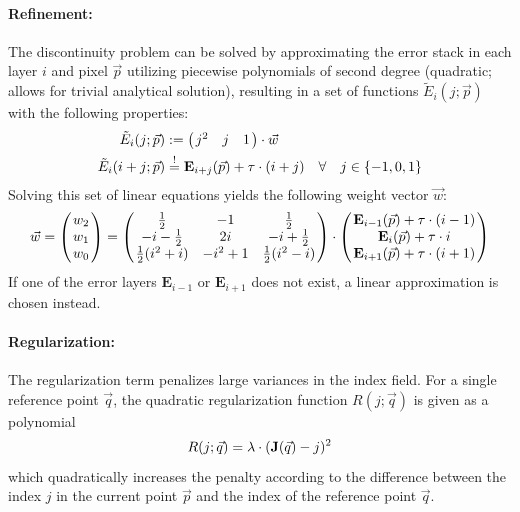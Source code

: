 \paragraph{Refinement:} The discontinuity problem can be solved by approximating the error stack in each layer $i$ and pixel $\vec p$ utilizing piecewise polynomials of second degree (quadratic; allows for trivial analytical solution), resulting in a set of functions $\tilde E_{i}(j; \vec p)$ with the following properties:
\begin{equation*}
	\begin{aligned}
		\tilde E_{i}(j; \vec p) &:= \begmat j^2 & j & 1 \finmat \cdot \vec w \\
		\tilde E_{i}(i + j; \vec p) &\overset{!}= \img{E}_{i + j}(\vec p) + \tau \cdot (i + j)\quad \forall \quad j \in \{-1, 0, 1\}
	\end{aligned}
\end{equation*}
Solving this set of linear equations yields the following weight vector $\vec w$:
\begin{equation}
	\vec w = \begmat w_2 \\ w_1 \\ w_0 \finmat =
	\begmat
		\frac{1}2 & -1 & \frac{1}2 \\
		-i - \frac{1}2 & 2 i & -i + \frac{1}2 \\
		\frac{1}2(i^2 + i) & -i^2 + 1 & \frac{1}2 (i^2 - i)
	\finmat
	\cdot
	\begmat
		\mathbf{E}_{i - 1}(\vec p) + \tau \cdot (i - 1) \\
		\mathbf{E}_{i}(\vec p) + \tau \cdot i \\
		\mathbf{E}_{i + 1}(\vec p) + \tau \cdot (i + 1)
	\finmat
	\label{eqn:polynomial_coeffs}
\end{equation}
If one of the error layers $\mathbf{E}_{i - 1}$ or $\mathbf{E}_{i + 1}$ does not exist, a linear approximation is chosen instead.

\paragraph{Regularization:} The regularization term penalizes large variances in the index field. For a single reference point $\vec q$, the quadratic regularization function $R(j; \vec q)$ is given as a polynomial
  $$R(j; \vec q) = \lambda \cdot (\img{J}(\vec q) - j)^2$$
which quadratically increases the penalty according to the difference between the index $j$ in the current point $\vec p$ and the index of the reference point $\vec q$.

